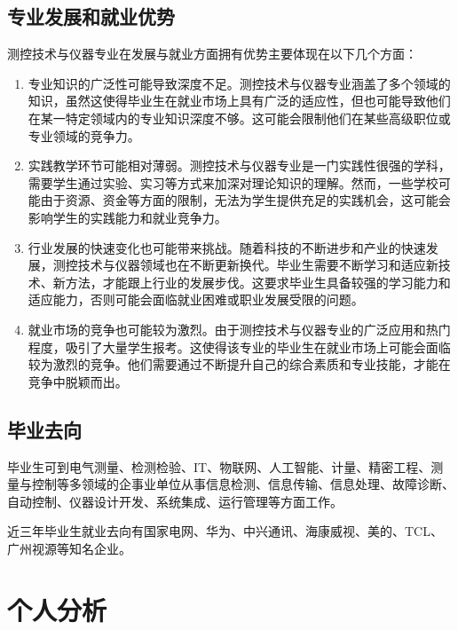 \documentclass{ctexart}
\begin{document}
		\subsection{专业发展和就业优势}
			测控技术与仪器专业在发展与就业方面拥有优势主要体现在以下几个方面：
			\begin{enumerate}
				\item 专业知识的广泛性可能导致深度不足。测控技术与仪器专业涵盖了多个领域的知识，虽然这使得毕业生在就业市场上具有广泛的适应性，但也可能导致他们在某一特定领域内的专业知识深度不够。这可能会限制他们在某些高级职位或专业领域的竞争力。
				\item 实践教学环节可能相对薄弱。测控技术与仪器专业是一门实践性很强的学科，需要学生通过实验、实习等方式来加深对理论知识的理解。然而，一些学校可能由于资源、资金等方面的限制，无法为学生提供充足的实践机会，这可能会影响学生的实践能力和就业竞争力。
				\item 行业发展的快速变化也可能带来挑战。随着科技的不断进步和产业的快速发展，测控技术与仪器领域也在不断更新换代。毕业生需要不断学习和适应新技术、新方法，才能跟上行业的发展步伐。这要求毕业生具备较强的学习能力和适应能力，否则可能会面临就业困难或职业发展受限的问题。
				\item 就业市场的竞争也可能较为激烈。由于测控技术与仪器专业的广泛应用和热门程度，吸引了大量学生报考。这使得该专业的毕业生在就业市场上可能会面临较为激烈的竞争。他们需要通过不断提升自己的综合素质和专业技能，才能在竞争中脱颖而出。
			\end{enumerate}
		\subsection{毕业去向}
			毕业生可到电气测量、检测检验、IT、物联网、人工智能、计量、精密工程、测量与控制等多领域的企事业单位从事信息检测、信息传输、信息处理、故障诊断、自动控制、仪器设计开发、系统集成、运行管理等方面工作。\par
			近三年毕业生就业去向有国家电网、华为、中兴通讯、海康威视、美的、TCL、广州视源等知名企业。
	\newpage
	\section{个人分析}
\end{document}
